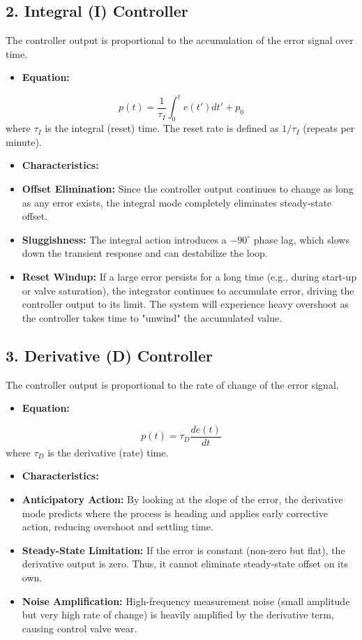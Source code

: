 \subsection{2. Integral (I) Controller}
The controller output is proportional to the accumulation of the error signal over time.
\begin{itemize}
  \item \textbf{Equation:}
\end{itemize}
  \[ p(t) = \frac{1}{\tau_I} \int_0^t e(t') dt' + p_0 \]
  where $\tau_I$ is the integral (reset) time. The reset rate is defined as $1/\tau_I$ (repeats per minute).
\begin{itemize}
  \item \textbf{Characteristics:}
  \item \textbf{Offset Elimination:} Since the controller output continues to change as long as any error exists, the integral mode completely eliminates steady-state offset.
  \item \textbf{Sluggishness:} The integral action introduces a $-90^\circ$ phase lag, which slows down the transient response and can destabilize the loop.
  \item \textbf{Reset Windup:} If a large error persists for a long time (e.g., during start-up or valve saturation), the integrator continues to accumulate error, driving the controller output to its limit. The system will experience heavy overshoot as the controller takes time to "unwind" the accumulated value.
\end{itemize}


\subsection{3. Derivative (D) Controller}
The controller output is proportional to the rate of change of the error signal.
\begin{itemize}
  \item \textbf{Equation:}
\end{itemize}
  \[ p(t) = \tau_D \frac{de(t)}{dt} \]
  where $\tau_D$ is the derivative (rate) time.
\begin{itemize}
  \item \textbf{Characteristics:}
  \item \textbf{Anticipatory Action:} By looking at the slope of the error, the derivative mode predicts where the process is heading and applies early corrective action, reducing overshoot and settling time.
  \item \textbf{Steady-State Limitation:} If the error is constant (non-zero but flat), the derivative output is zero. Thus, it cannot eliminate steady-state offset on its own.
  \item \textbf{Noise Amplification:} High-frequency measurement noise (small amplitude but very high rate of change) is heavily amplified by the derivative term, causing control valve wear.
\end{itemize}


